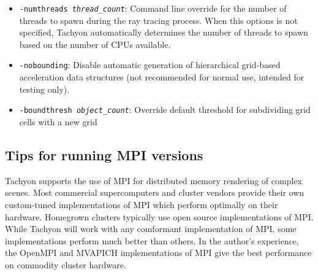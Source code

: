 \begin{itemize}
\item{{\tt -numthreads {\it thread\_count}}}: 
      Command line override for the number of threads to spawn during 
      the ray tracing process.  When this options is not specified, 
      Tachyon automatically determines the number of threads
      to spawn based on the number of CPUs available.
\item{{\tt -nobounding}}: Disable automatic generation of hierarchical
      grid-based acceleration data structures (not recommended for 
      normal use, intended for testing only).
\item{{\tt -boundthresh {\it object\_count}}}: Override default threshold for 
      subdividing grid cells with a new grid
\end{itemize}


\subsection{Tips for running MPI versions}
Tachyon supports the use of MPI for distributed memory rendering
of complex scenes.  Most commercial supercomputers and cluster
vendors provide their own custom-tuned implementations of MPI
which perform optimally on their hardware.  Homegrown clusters
typically use open source implementations of MPI.
While Tachyon will work with any comformant implementation of MPI,
some implementations perform much better than others.  In the
author's experience, the  OpenMPI and MVAPICH implementations 
of MPI give the best performance on commodity cluster hardware.
